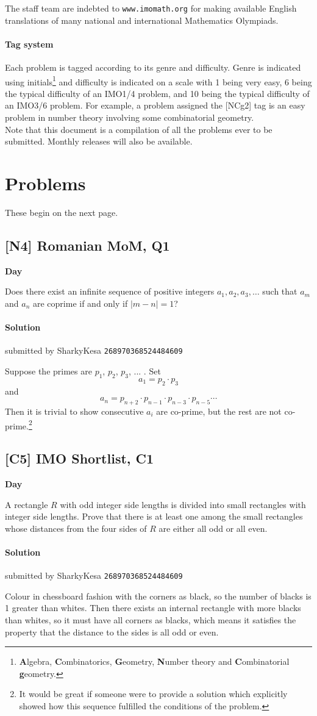 \documentclass[10pt]{article}
\newcommand{\themonth}{March}
\newcommand{\theyear}{2019}
\newcounter{day}
\newcounter{solution}
\newcounter{datenumber}
\newcommand{\problem}[4][0]{
	\newpage
	\subsection{[#3] \space #2} \hfill 
	{\large\textbf{Day \arabic{day}}} %
	\begin{flushleft} #4 \end{flushleft}
	\vspace{1em}
	\addtocounter{day}{1}
	\addtocounter{datenumber}{1}
	\setcounter{solution}{1}
}
\newcommand{\solution}[4][0]{
	\paragraph{Solution \arabic{solution}} \hfill submitted by #2 \hfill \texttt{#3}
	\begin{flushleft} #4 \end{flushleft}
	\addtocounter{solution}{1}
	\vspace{1em}
}
\begin{document}
The staff team are indebted to \texttt{www.imomath.org} for making available English translations of many national and international Mathematics Olympiads.

\paragraph{Tag system} Each problem is tagged according to its genre and difficulty. Genre is indicated using initials\footnote{\textbf{A}lgebra, \textbf{C}ombinatorics, \textbf{G}eometry, \textbf{N}umber theory and \textbf{C}ombinatorial \textbf{g}eometry.} and difficulty is indicated on a scale with 1 being very easy, 6 being the typical difficulty of an IMO1/4 problem, and 10 being the typical difficulty of an IMO3/6 problem. For example, a problem assigned the [NCg2] tag is an easy problem in number theory involving some combinatorial geometry.\\

Note that this document is a compilation of all the problems ever to be submitted. Monthly releases will also be available. 

\section{Problems}

These begin on the next page.

\problem[1]{2015 Romanian MoM, Q1}{N4}{Does there exist an infinite sequence of positive integers $a_1, a_2, a_3, \dots$ such that $a_m$ and $a_n$ are coprime if and only if $\lvert m - n \rvert = 1$?}

\solution[1]{SharkyKesa}{268970368524484609}{Suppose the primes are $p_1$, $p_2$, $p_3$, ... . Set $$a_1 = p_2 \cdot p_3$$and $$a_n = p_{n+2} \cdot p_{n-1} \cdot p_{n-3} \cdot p_{n-5} \cdots$$ Then it is trivial to show consecutive $a_i$ are co-prime, but the rest are not co-prime.\footnote{It would be great if someone were to provide a solution which explicitly showed how this sequence fulfilled the conditions of the problem.}}

\problem[2]{2018 IMO Shortlist, C1}{C5}{A rectangle $R$ with odd integer side lengths is divided into small rectangles with integer side lengths. Prove that there is at least one among the small rectangles whose distances from the four sides of $R$ are either all odd or all even.}

\solution[2]{SharkyKesa}{268970368524484609}{Colour in chessboard fashion with the corners as black, so the number of blacks is 1 greater than whites. Then there exists an internal rectangle with more blacks than whites, so it must have all corners as blacks, which means it satisfies the property that the distance to the sides is all odd or even.}
\end{document}
